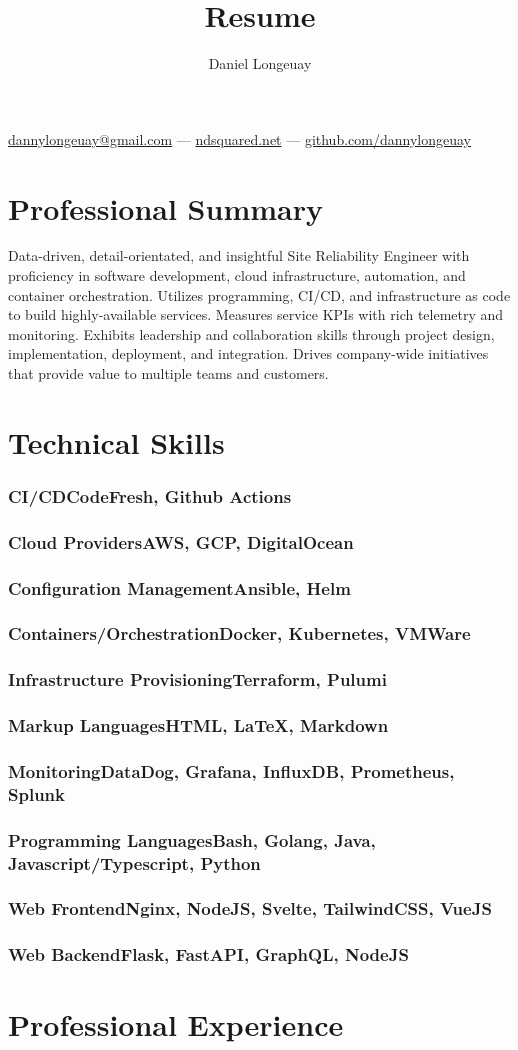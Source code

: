\documentclass[letterpaper,11pt]{article}
\makeatletter
\renewcommand{\maketitle}{
  \begin{center}
    {\huge\bfseries\theauthor}

    \vspace{.25em}

    {\href{mailto:dannylongeuay@gmail.com}{dannylongeuay@gmail.com} --- \href{https://ndsquared.net/}{ndsquared.net} --- \href{https://github.com/dannylongeuay}{github.com/dannylongeuay}}
  \end{center}
}
\newcommand{\skill}[2]{\subsubsection{\hspace{.5em}#1\hfill\mdseries#2}\vspace{-.5em}}
\makeatother
\begin{document}
\title{Resume}
\author{Daniel Longeuay}

\maketitle

\section{Professional Summary}

Data-driven, detail-orientated, and insightful Site Reliability Engineer with proficiency in software
development, cloud infrastructure, automation, and container orchestration. Utilizes programming, CI/CD,
and infrastructure as code to build highly-available services. Measures service KPIs with rich telemetry
and monitoring. Exhibits leadership and collaboration skills through project design, implementation, 
deployment, and integration. Drives company-wide initiatives that provide value to multiple teams and customers.

\section{Technical Skills}

  \skill{CI/CD}{CodeFresh, Github Actions}

  \skill{Cloud Providers}{AWS, GCP, DigitalOcean}

  \skill{Configuration Management}{Ansible, Helm}

  \skill{Containers/Orchestration}{Docker, Kubernetes, VMWare}

  \skill{Infrastructure Provisioning}{Terraform, Pulumi}

  \skill{Markup Languages}{HTML, {\LaTeX}, Markdown}

  \skill{Monitoring}{DataDog, Grafana, InfluxDB, Prometheus, Splunk}

  \skill{Programming Languages}{Bash, Golang, Java, Javascript/Typescript, Python}

  \skill{Web Frontend}{Nginx, NodeJS, Svelte, TailwindCSS, VueJS}

  \skill{Web Backend}{Flask, FastAPI, GraphQL, NodeJS}

\section{\vspace{.5em}Professional Experience}
\end{document}
